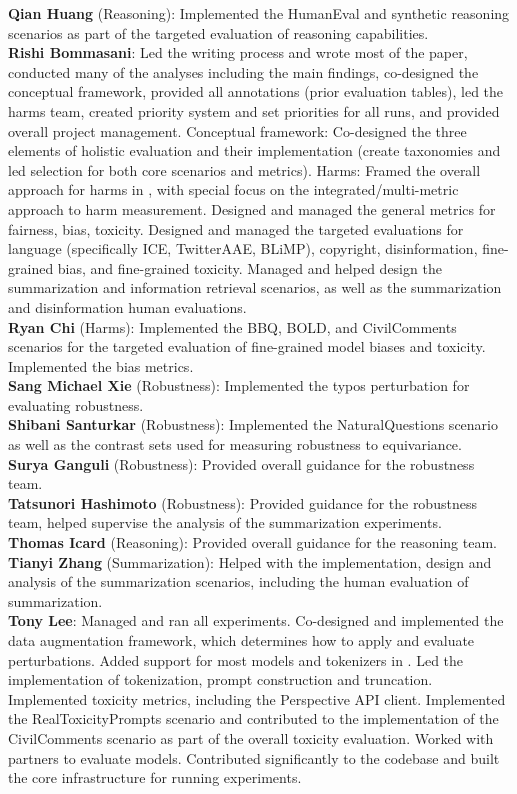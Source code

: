 \textbf{Qian Huang} (Reasoning): Implemented the HumanEval and synthetic reasoning scenarios as part of the targeted evaluation of reasoning capabilities. \\ 
\textbf{Rishi Bommasani}: Led the writing process and wrote most of the paper, conducted many of the analyses including the main findings, co-designed the conceptual framework, provided all annotations (\eg prior evaluation tables), led the harms team, created priority system and set priorities for all runs, and provided overall project management. 
Conceptual framework: Co-designed the three elements of holistic evaluation and their implementation (\eg create taxonomies and led selection for both core scenarios and metrics).
Harms: Framed the overall approach for harms in \benchmarkname, with special focus on the integrated/multi-metric approach to harm measurement.
Designed and managed the general metrics for fairness, bias, toxicity. 
Designed and managed the targeted evaluations for language (specifically ICE, TwitterAAE, BLiMP), copyright, disinformation, fine-grained bias, and fine-grained toxicity.
Managed and helped design the summarization and information retrieval scenarios, as well as the summarization and disinformation human evaluations.
\\ 
\textbf{Ryan Chi} (Harms): Implemented the BBQ, BOLD, and CivilComments scenarios for the targeted evaluation of fine-grained model biases and toxicity. Implemented the bias metrics. \\ 
\textbf{Sang Michael Xie} (Robustness): Implemented the typos perturbation for evaluating robustness. \\ 
\textbf{Shibani Santurkar} (Robustness): Implemented the NaturalQuestions scenario as well as the contrast sets used for measuring robustness to equivariance. \\ 
\textbf{Surya Ganguli} (Robustness): Provided overall guidance for the robustness team. \\ 
\textbf{Tatsunori Hashimoto} (Robustness): Provided guidance for the robustness team, helped supervise the analysis of the summarization experiments. \\ 
\textbf{Thomas Icard} (Reasoning): Provided overall guidance for the reasoning team. \\ 
\textbf{Tianyi Zhang} (Summarization): Helped with the implementation, design and analysis of the summarization scenarios, including the human evaluation of summarization. \\ 
\textbf{Tony Lee}: Managed and ran all experiments. Co-designed and implemented the data augmentation framework, which determines how to apply and evaluate perturbations. Added support for most models and tokenizers in \benchmarkname. Led the implementation of tokenization, prompt construction and truncation. Implemented toxicity metrics, including the Perspective API client. Implemented the RealToxicityPrompts scenario and contributed to the implementation of the CivilComments scenario as part of the overall toxicity evaluation. Worked with partners to evaluate models. Contributed significantly to the codebase and built the core infrastructure for running experiments. \\ 
